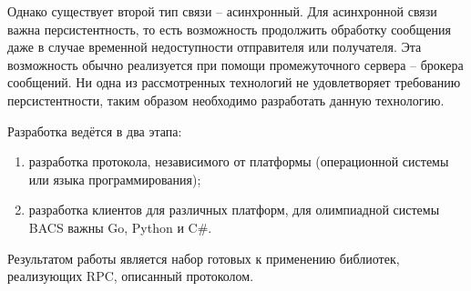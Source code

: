 Однако существует второй тип связи -- асинхронный. Для асинхронной связи
важна персистентность, то есть возможность продолжить обработку сообщения
даже в случае временной недоступности отправителя или получателя.
Эта возможность обычно реализуется при помощи промежуточного сервера --
брокера сообщений. Ни одна из рассмотренных технологий не удовлетворяет
требованию персистентности, таким образом необходимо разработать данную
технологию.

Разработка ведётся в два этапа:
\begin{enumerate}
    \item разработка протокола, независимого от платформы (операционной системы
        или языка программирования);
    \item разработка клиентов для различных платформ, для олимпиадной системы
        BACS важны Go, Python и C\#.
\end{enumerate}
Результатом работы является набор готовых к применению библиотек,
реализующих RPC, описанный протоколом.
